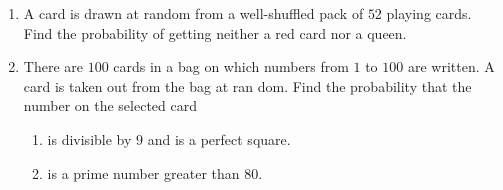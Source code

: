 \documentclass{article}                                         %
\begin{document}
                                                                                                                \begin{enumerate}
    \item A card is drawn at random from a well-shuffled pack of $52$ playing cards. Find the probability of getting neither a red card nor a queen.

\item There are $100$ cards in a bag on which numbers from $
1$ to $100$ are written. A card is taken out from the bag at ran
dom. Find the probability that the number on the selected card
    \begin{enumerate}
        \item is divisible by $9$ and is a perfect square.
        \item is a prime number greater than $80$.                  \end{enumerate}
								\end{enumerate}
\end{document}
